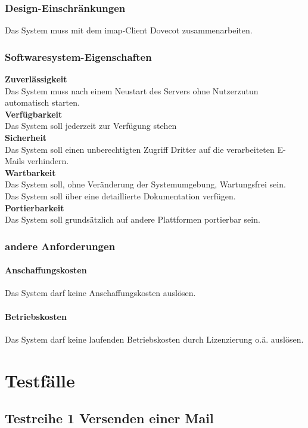 \subsection{Design-Einschränkungen}
Das System muss mit dem \ac{imap}-Client Dovecot zusammenarbeiten.
\subsection{Softwaresystem-Eigenschaften}
\textbf{Zuverlässigkeit} \\
Das System muss nach einem Neustart des Servers ohne Nutzerzutun automatisch starten.\\
\textbf{Verfügbarkeit} \\
Das System soll jederzeit zur Verfügung stehen\\
\textbf{Sicherheit} \\
Das System soll einen unberechtigten Zugriff Dritter auf die verarbeiteten E-Mails verhindern.\\
\textbf{Wartbarkeit} \\
Das System soll, ohne Veränderung der Systemumgebung, Wartungsfrei sein.\\
Das System soll über eine detaillierte Dokumentation verfügen.\\
\textbf{Portierbarkeit} \\
Das System soll grundsätzlich auf andere Plattformen portierbar sein.\\

\subsection{andere Anforderungen}
\subsubsection{Anschaffungskosten}
Das System darf keine Anschaffungskosten auslösen.
\subsubsection{Betriebskosten}
Das System darf keine laufenden Betriebskosten durch Lizenzierung o.ä. auslösen.


\chapter{Testfälle}
\label{ch:Testfaelle}

\section{Testreihe 1 Versenden einer Mail}
